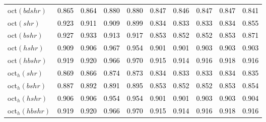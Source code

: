 \begin{tabular}[t]{>{\centering\arraybackslash}m{2.5cm}ccccccccc}
oct$(bdshr)$ & \textcolor{black}{0.865} & \textcolor{black}{0.864} & \textcolor{black}{0.880} & \textcolor{black}{0.880} & \textcolor{black}{0.847} & \textcolor{black}{0.846} & \textcolor{black}{0.847} & \textcolor{black}{0.847} & \textcolor{black}{0.841}\\
oct$(shr)$ & \textcolor{black}{0.923} & \textcolor{black}{0.911} & \textcolor{black}{0.909} & \textcolor{black}{0.899} & \textcolor{black}{0.834} & \textcolor{black}{0.833} & \textcolor{black}{0.833} & \textcolor{black}{0.834} & \textcolor{black}{0.855}\\
oct$(bshr)$ & \textcolor{black}{0.927} & \textcolor{black}{0.933} & \textcolor{black}{0.913} & \textcolor{black}{0.917} & \textcolor{black}{0.853} & \textcolor{black}{0.852} & \textcolor{black}{0.852} & \textcolor{black}{0.853} & \textcolor{black}{0.871}\\
oct$(hshr)$ & \textcolor{black}{0.909} & \textcolor{black}{0.906} & \textcolor{black}{0.967} & \textcolor{black}{0.954} & \textcolor{black}{0.901} & \textcolor{black}{0.901} & \textcolor{black}{0.903} & \textcolor{black}{0.903} & \textcolor{black}{0.903}\\
oct$(hbshr)$ & \textcolor{black}{0.919} & \textcolor{black}{0.920} & \textcolor{black}{0.966} & \textcolor{black}{0.970} & \textcolor{black}{0.915} & \textcolor{black}{0.914} & \textcolor{black}{0.916} & \textcolor{black}{0.918} & \textcolor{black}{0.916}\\
oct$_h(shr)$ & \textcolor{black}{0.869} & \textcolor{black}{0.866} & \textcolor{black}{0.874} & \textcolor{black}{0.873} & \textcolor{black}{0.834} & \textcolor{black}{0.833} & \textcolor{black}{0.833} & \textcolor{black}{0.834} & \textcolor{black}{0.835}\\
oct$_h(bshr)$ & \textcolor{black}{0.887} & \textcolor{black}{0.892} & \textcolor{black}{0.891} & \textcolor{black}{0.895} & \textcolor{black}{0.853} & \textcolor{black}{0.852} & \textcolor{black}{0.852} & \textcolor{black}{0.853} & \textcolor{black}{0.854}\\
oct$_h(hshr)$ & \textcolor{black}{0.906} & \textcolor{black}{0.906} & \textcolor{black}{0.954} & \textcolor{black}{0.954} & \textcolor{black}{0.901} & \textcolor{black}{0.901} & \textcolor{black}{0.903} & \textcolor{black}{0.903} & \textcolor{black}{0.904}\\
oct$_h(hbshr)$ & \textcolor{black}{0.919} & \textcolor{black}{0.920} & \textcolor{black}{0.966} & \textcolor{black}{0.970} & \textcolor{black}{0.915} & \textcolor{black}{0.914} & \textcolor{black}{0.916} & \textcolor{black}{0.918} & \textcolor{black}{0.916}\\
\bottomrule
\end{tabular}
